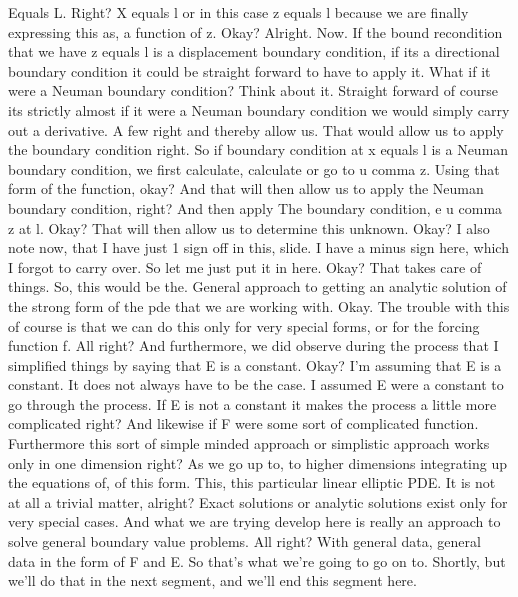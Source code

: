 \documentclass[10pt]{article}
\begin{document}
Equals L. Right? X equals l or in this case z equals l because we are finally expressing this as, a function of z. Okay? Alright. Now. If the bound recondition that we have z equals l is a displacement boundary condition, if its a directional boundary condition it could be straight forward to have to apply it. What if it were a Neuman boundary condition? Think about it. Straight forward of course its strictly almost if it were a Neuman boundary condition we would simply carry out a derivative. A few right and thereby allow us. That would allow us to apply the boundary condition right. So if boundary condition at x equals l is a Neuman boundary condition, we first calculate, calculate or go to u comma z. Using that form of the function, okay? And that will then allow us to apply the Neuman boundary condition, right? And then apply The boundary condition, e u comma z at l. Okay? That will then allow us to determine this unknown. Okay? I also note now, that I have just 1 sign off in this, slide. I have a minus sign here, which I forgot to carry over. So let me just put it in here. Okay? That takes care of things. So, this would be the. General approach to getting an analytic solution of the strong form of the pde that we are working with. Okay. The trouble with this of course is that we can do this only for very special forms, or for the forcing function f. All right? And furthermore, we did observe during the process that I simplified things by saying that E is a constant. Okay? I'm assuming that E is a constant. It does not always have to be the case. I assumed E were a constant to go through the process. If E is not a constant it makes the process a little more complicated right? And likewise if F were some sort of complicated function. Furthermore this sort of simple minded approach or simplistic approach works only in one dimension right? As we go up to, to higher dimensions integrating up the equations of, of this form. This, this particular linear elliptic PDE. It is not at all a trivial matter, alright? Exact solutions or analytic solutions exist only for very special cases. And what we are trying develop here is really an approach to solve general boundary value problems. All right? With general data, general data in the form of F and E. So that's what we're going to go on to. Shortly, but we'll do that in the next segment, and we'll end this segment here.
\end{document}

